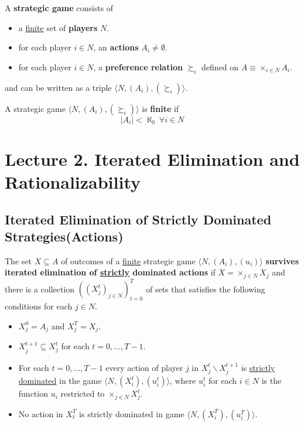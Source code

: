 \documentclass[11pt]{article}
\begin{document}
		\begin{definition}[11.1]
			A \textbf{strategic game} consists of
			\begin{itemize}
				\item a \ul{finite} set of \textbf{players} $N$.
				\item for each player $i \in N$, an \textbf{actions} $A_i \neq \emptyset$.
				\item for each player $i \in N$, a \textbf{preference relation} $\succsim_i$ defined on $A \equiv \times_{i\in N}A_i$.
			\end{itemize}
			and can be written as a triple $\langle N, (A_i), (\succsim_i) \rangle$.
		\end{definition}
		
		\begin{definition}[pg.11]
			A strategic game $\langle N, (A_i), (\succsim_i) \rangle$ is \textbf{finite} if 
			\[
				|A_i| < \aleph_0\ \forall i \in N
			\]
		\end{definition}
		
	\section{Lecture 2. Iterated Elimination and Rationalizability}
		\subsection{Iterated Elimination of Strictly Dominated Strategies(Actions)}
			\begin{definition}[60.2]
				The set $X \subseteq A$ of outcomes of a \ul{finite} strategic game $\langle N, (A_i), (u_i) \rangle$ \textbf{survives iterated elimination of \ul{strictly} dominated actions} if $X = \times_{j \in N} X_j$ and there is a collection $((X_j^t)_{j \in N})_{t=0}^T$ of sets that satisfies the following conditions for each $j \in N$.
				\begin{itemize}
					\item $X_j^0 = A_j$ and $X_j^T = X_j$.
					\item $X_j^{t+1} \subseteq X_j^t$ for each $t = 0, \dots, T - 1$.
					\item For each $t = 0, \dots, T-1$ every action of player $j$ in $X_j^t \backslash X_j^{t+1}$ is \ul{strictly dominated} in the game $\langle N, (X_i^t), (u_i^t) \rangle$, where $u_i^t$ for each $i \in N$ is the function $u_i$ restricted to $\times_{j \in N} X_j^t$.
					\item No action in $X_t^T$ is strictly dominated in game $\langle N, (X_i^T), (u_i^T) \rangle$.
				\end{itemize}
			\end{definition}
			
\end{document}
